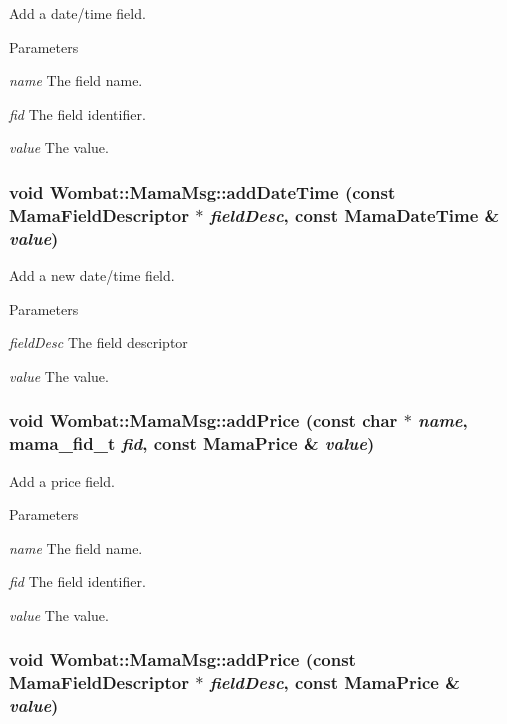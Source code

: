 Add a date/time field. 
\begin{DoxyParams}{Parameters}
\item[{\em name}]The field name. \item[{\em fid}]The field identifier. \item[{\em value}]The value. \end{DoxyParams}
\hypertarget{classWombat_1_1MamaMsg_a0597ee3c41019c631f2e7abe36e7f8e8}{
\subsubsection[{addDateTime}]{\setlength{\rightskip}{0pt plus 5cm}void Wombat::MamaMsg::addDateTime (const {\bf MamaFieldDescriptor} $\ast$ {\em fieldDesc}, \/  const {\bf MamaDateTime} \& {\em value})}}
\label{classWombat_1_1MamaMsg_a0597ee3c41019c631f2e7abe36e7f8e8}


Add a new date/time field. 
\begin{DoxyParams}{Parameters}
\item[{\em fieldDesc}]The field descriptor \item[{\em value}]The value. \end{DoxyParams}
\hypertarget{classWombat_1_1MamaMsg_aa6dc9ba3aa320dd49b18e06158e97795}{
\subsubsection[{addPrice}]{\setlength{\rightskip}{0pt plus 5cm}void Wombat::MamaMsg::addPrice (const char $\ast$ {\em name}, \/  mama\_\-fid\_\-t {\em fid}, \/  const {\bf MamaPrice} \& {\em value})}}
\label{classWombat_1_1MamaMsg_aa6dc9ba3aa320dd49b18e06158e97795}


Add a price field. 
\begin{DoxyParams}{Parameters}
\item[{\em name}]The field name. \item[{\em fid}]The field identifier. \item[{\em value}]The value. \end{DoxyParams}
\hypertarget{classWombat_1_1MamaMsg_a49d52a4e265ba3479572c6d549058002}{
\subsubsection[{addPrice}]{\setlength{\rightskip}{0pt plus 5cm}void Wombat::MamaMsg::addPrice (const {\bf MamaFieldDescriptor} $\ast$ {\em fieldDesc}, \/  const {\bf MamaPrice} \& {\em value})}}
\label{classWombat_1_1MamaMsg_a49d52a4e265ba3479572c6d549058002}


